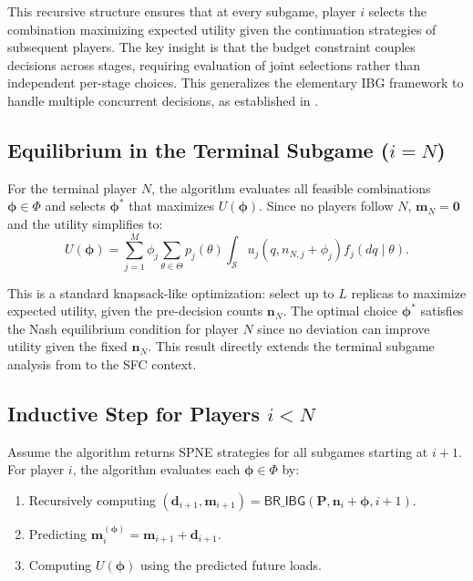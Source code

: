 \documentclass[journal]{IEEEtran}
\theoremstyle{plain}
\theoremstyle{definition}
\theoremstyle{remark}
\begin{document}
This recursive structure ensures that at every subgame, player $i$ selects the combination maximizing expected utility given the continuation strategies of subsequent players. The key insight is that the budget constraint couples decisions across stages, requiring evaluation of joint selections rather than independent per-stage choices. This generalizes the elementary IBG framework to handle multiple concurrent decisions, as established in \cite{jiang2015indian, section IV}.

\subsection{Equilibrium in the Terminal Subgame ($i = N$)}
\label{app:proof_thm2_sec2}

For the terminal player $N$, the algorithm evaluates all feasible combinations $\boldsymbol{\phi} \in \Phi$ and selects $\boldsymbol{\phi}^*$ that maximizes $U(\boldsymbol{\phi})$. Since no players follow $N$, $\mathbf{m}_N = \mathbf{0}$ and the utility simplifies to:
\begin{equation}
U(\boldsymbol{\phi}) = \sum_{j=1}^M \phi_j \sum_{\theta \in \Theta} p_j(\theta) \int_{\mathcal{S}} u_j(q, n_{N,j} + \phi_j) f_j(dq \mid \theta).
\end{equation}

This is a standard knapsack-like optimization: select up to $L$ replicas to maximize expected utility, given the pre-decision counts $\mathbf{n}_N$. The optimal choice $\boldsymbol{\phi}^*$ satisfies the Nash equilibrium condition for player $N$ since no deviation can improve utility given the fixed $\mathbf{n}_N$. This result directly extends the terminal subgame analysis from \cite{jiang2015indian, section IV} to the SFC context.

\subsection{Inductive Step for Players $i < N$}
\label{app:proof_thm2_sec3}

Assume the algorithm returns SPNE strategies for all subgames starting at $i+1$. For player $i$, the algorithm evaluates each $\boldsymbol{\phi} \in \Phi$ by:
\begin{enumerate}
    \item Recursively computing $(\mathbf{d}_{i+1}, \mathbf{m}_{i+1}) = \textsf{BR\_IBG}(\mathbf{P}, \mathbf{n}_i + \boldsymbol{\phi}, i+1)$.
    \item Predicting $\mathbf{m}_i^{(\boldsymbol{\phi})} = \mathbf{m}_{i+1} + \mathbf{d}_{i+1}$.
    \item Computing $U(\boldsymbol{\phi})$ using the predicted future loads.
\end{enumerate}
\end{document}
